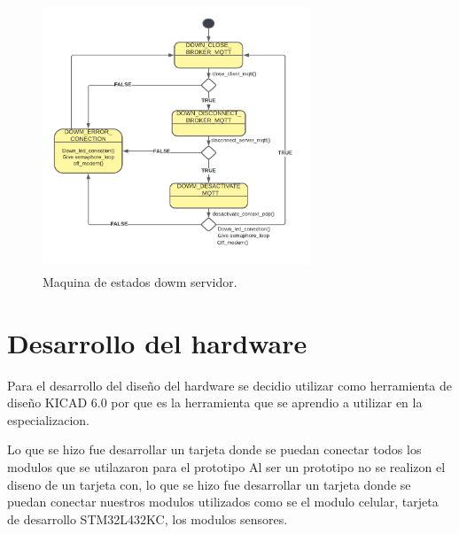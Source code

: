 \begin{figure}[htbp]
  \centering
	\includegraphics[width=8cm, height=8cm]{./Figures/SM down server.png}
	\caption{Maquina de estados dowm servidor.}
	\label{fig:Maquina de estados dowm servidor}
\end{figure}

\clearpage

\section{Desarrollo del hardware}

Para el desarrollo del diseño del hardware se decidio utilizar como herramienta de diseño KICAD 6.0 por que es la herramienta que se aprendio a utilizar en la especializacion.

Lo que se hizo fue desarrollar un tarjeta donde se puedan conectar todos los modulos que se utilazaron para el prototipo
Al ser un prototipo no se realizon el diseno de un tarjeta con, lo que se hizo fue desarrollar un tarjeta donde se puedan conectar nuestros modulos utilizados como se el modulo celular, tarjeta de desarrollo STM32L432KC, los modulos sensores.
 
